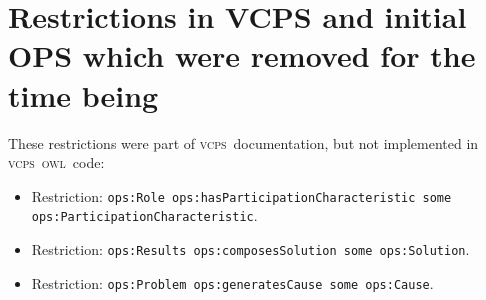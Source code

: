 \documentclass[10pt,letterpaper]{article}
\newcommand{\ops}{\textsc{ops}}
\newcommand{\vcps}{\textsc{vcps}}
\newcommand{\owl}{\textsc{owl}}
\newcommand{\bfo}{\textsc{bfo}}
\newcommand{\foaf}{\textsc{foaf}}
\begin{document}
\appendix

%
%
%
\section{Restrictions in VCPS and initial OPS which were removed for the time being}\label{ap:restr}

These restrictions were part of \vcps\ documentation, but not implemented in \vcps\ \owl\ code:
\begin{itemize}
    \item Restriction: {\tt ops:Role ops:hasParticipationCharacteristic some ops:ParticipationCharacteristic}.
    \item Restriction: {\tt ops:Results ops:composesSolution some ops:Solution}.
    \item Restriction: {\tt ops:Problem ops:generatesCause some ops:Cause}.
\end{itemize}
\end{document}
